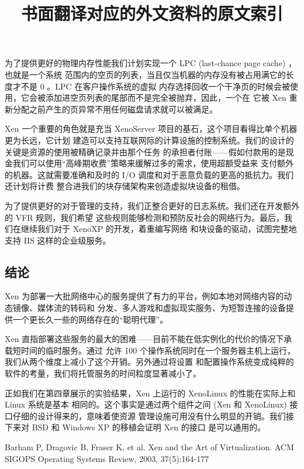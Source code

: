 为了提供更好的物理内存性能我们计划实现一个 LPC (last-chance page cache) ，也就是一个系统
范围内的空页的列表，当且仅当机器的内存没有被占用满它的长度才不是 0 。LPC 在客户操作系统的虚拟
内存选择回收一个干净页的时候会被使用，它会被添加进空页列表的尾部而不是完全被抛弃，因此，一个在
它被 Xen 重新分配之前产生的页异常不用任何磁盘请求就可以被满足。

Xen 一个重要的角色就是充当 XenoServer 项目的基石，这个项目看得比单个机器更为长远，它计划
建造可以支持互联网际的计算设施的控制系统。我们的设计的关键是资源的使用被精确记录并由那个任务
的承担者付账——假如付款用的是现金我们可以使用“高峰期收费”策略来缓解过多的需求，使用超额受益来
支付额外的机器。这就需要准确和及时的 I/O 调度和对于恶意负载的更高的抵抗力。我们还计划将计费
整合进我们的块存储架构来创造虚拟块设备的租借。

为了提供更好的对于管理的支持，我们正整合更好的日志系统。我们还在开发额外的 VFR 规则，我们希望
这些规则能够检测和预防反社会的网络行为。最后，我们在继续我们对于 XenoXP 的开发，着重编写网络
和块设备的驱动，试图完整地支持 IIS 这样的企业级服务。

\subsection{结论}

Xen 为部署一大批网络中心的服务提供了有力的平台，例如本地对网络内容的动态镜像、媒体流的转码和
分发、多人游戏和虚拟现实服务、为短暂连接的设备提供一个更长久一些的网络存在的“聪明代理”。

Xen 直指部署这些服务的最大的困难——目前不能在低实例化的代价的情况下承载短时间的临时服务。通过
允许 100 个操作系统同时在一个服务器主机上运行，我们从两个维度上减小了这个开销。另外通过将设置
和配置操作系统变成纯粹的软件的考量，我们将托管服务的时间粒度显著减小了。

正如我们在第四章展示的实验结果，Xen 上运行的 XenoLinux 的性能在实际上和 Linux 系统是基本
相同的。这个事实是通过两个组件之间 (Xen 和 XenoLinux) 接口仔细的设计得来的，意味着使资源
管理设施可用没有什么明显的开销。我们接下来对 BSD 和 Windows XP 的移植会证明 Xen 的接口
是可以通用的。

\title{书面翻译对应的外文资料的原文索引}

Barham P, Dragovic B, Fraser K, et al. Xen and the Art of Virtualization.
ACM SIGOPS Operating Systems Review, 2003, 37(5):164-177
